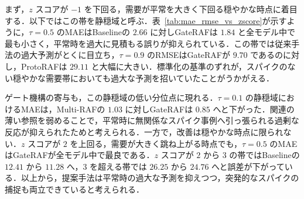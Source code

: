 \documentclass[twocolumn, lastpage]{jarticle}
\begin{document}
まず，$z$ スコアが $-1$ を下回る，需要が平常を大きく下回る穏やかな時点に着目する．以下ではこの帯を静穏域と呼ぶ．表~\ref{tab:mae_rmse_vs_zscore}が示すように，$\tau=0.5$ のMAEはBaselineの $2.66$ に対しGateRAFは $1.84$ と全モデル中で最も小さく，平常時を過大に見積もる誤りが抑えられている．この帯では従来手法の過大予測がとくに目立ち，$\tau=0.9$ のRMSEはGateRAFが $9.70$ であるのに対し，ProtoRAFは $29.11$ と大幅に大きい．標準化の基準のずれが，スパイクのない穏やかな需要帯においても過大な予測を招いていたことがうかがえる．

ゲート機構の寄与も，この静穏域の低い分位点に現れる．$\tau=0.1$ の静穏域におけるMAEは，Multi-RAFの $1.03$ に対しGateRAFは $0.85$ へと下がった．関連の薄い参照を弱めることで，平常時に無関係なスパイク事例へ引っ張られる過剰な反応が抑えられたためと考えられる．一方で，改善は穏やかな時点に限られない．$z$ スコアが $2$ を上回る，需要が大きく跳ね上がる時点でも，$\tau=0.5$ のMAEはGateRAFが全モデル中で最良である．$z$ スコアが $2$ から $3$ の帯ではBaselineの $12.41$ から $11.28$ へ，$3$ を超える帯では $26.25$ から $24.76$ へと誤差が下がっている．以上から，提案手法は平常時の過大な予測を抑えつつ，突発的なスパイクの捕捉も両立できていると考えられる．
\end{document}
